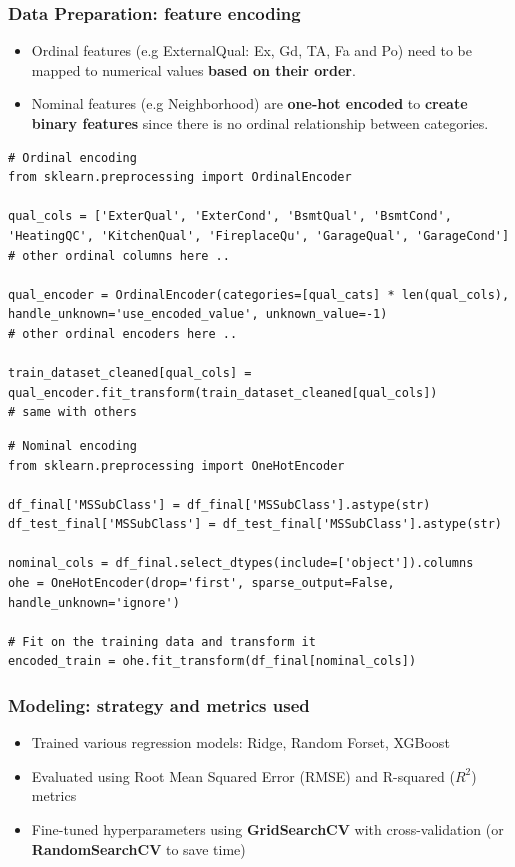 \documentclass{beamer}
\begin{document}
\begin{frame}
\frametitle{Data Preparation: feature encoding}

\begin{itemize}
    \item Ordinal features (e.g ExternalQual: Ex, Gd, TA, Fa and Po) need to be mapped to numerical values \textbf{based on their order}.
    \item Nominal features (e.g Neighborhood) are \textbf{one-hot encoded} to \textbf{create binary features} since there is no ordinal relationship between categories.
\end{itemize}

\end{frame}

\begin{frame}[fragile]
\begin{verbatim}
# Ordinal encoding
from sklearn.preprocessing import OrdinalEncoder

qual_cols = ['ExterQual', 'ExterCond', 'BsmtQual', 'BsmtCond', 'HeatingQC', 'KitchenQual', 'FireplaceQu', 'GarageQual', 'GarageCond']
# other ordinal columns here ..

qual_encoder = OrdinalEncoder(categories=[qual_cats] * len(qual_cols), handle_unknown='use_encoded_value', unknown_value=-1)
# other ordinal encoders here ..

train_dataset_cleaned[qual_cols] = qual_encoder.fit_transform(train_dataset_cleaned[qual_cols])
# same with others
\end{verbatim}

\begin{verbatim}
# Nominal encoding
from sklearn.preprocessing import OneHotEncoder

df_final['MSSubClass'] = df_final['MSSubClass'].astype(str)
df_test_final['MSSubClass'] = df_test_final['MSSubClass'].astype(str)

nominal_cols = df_final.select_dtypes(include=['object']).columns
ohe = OneHotEncoder(drop='first', sparse_output=False, handle_unknown='ignore')

# Fit on the training data and transform it
encoded_train = ohe.fit_transform(df_final[nominal_cols])
\end{verbatim}
\end{frame}

\begin{frame}
\frametitle{Modeling: strategy and metrics used}

\begin{itemize}
    \item Trained various regression models: Ridge, Random Forset, XGBoost
    \item Evaluated using Root Mean Squared Error (RMSE) and R-squared ($R^2$) metrics
    \item Fine-tuned hyperparameters using \textbf{GridSearchCV} with cross-validation (or \textbf{RandomSearchCV} to save time)
\end{itemize}
\end{frame}
\end{document}
